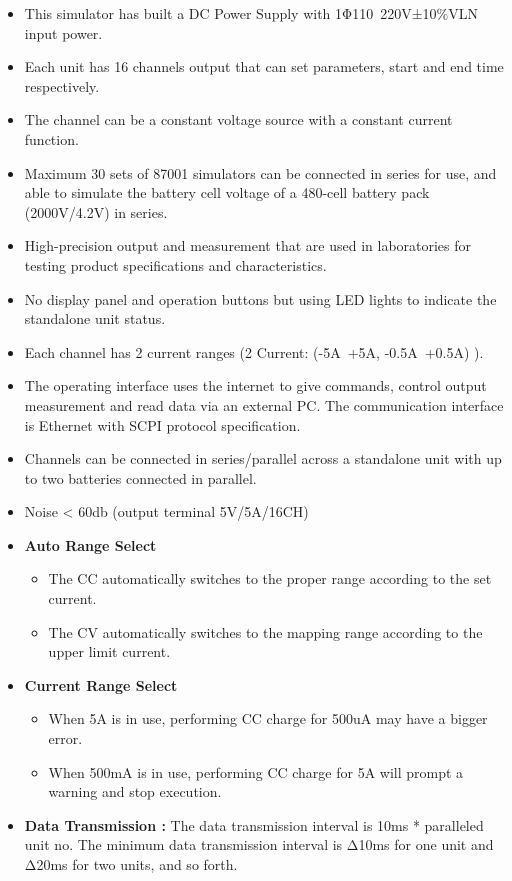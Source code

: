 \begin{itemize}
    \item This simulator has built a DC Power Supply with 1Φ110~220V±10$\%$VLN input power.
    \item Each unit has 16 channels output that can set parameters, start and end time respectively.
    \item The channel can be a constant voltage source with a constant current function.
    \item Maximum 30 sets of 87001 simulators can be connected in series for use, and able to simulate the battery cell voltage of a 480-cell battery pack (2000V/4.2V) in series.
    \item High-precision output and measurement that are used in laboratories for testing product specifications and characteristics.
    \item No display panel and operation buttons but using LED lights to indicate the standalone unit status.
    \item Each channel has 2 current ranges (2 Current: (-5A~+5A, -0.5A~+0.5A) ).
    \item The operating interface uses the internet to give commands, control output measurement and read data via an external PC. The communication interface is Ethernet with SCPI protocol specification.
    \item Channels can be connected in series/parallel across a standalone unit with up to two batteries connected in parallel.
    \item Noise < 60db (output terminal 5V/5A/16CH)
    \item \textbf{Auto Range Select }
            \begin{itemize}
                \item The CC automatically switches to the proper range according to the set current.
                \item The CV automatically switches to the mapping range according to the upper limit current.
            \end{itemize} 
    \item \textbf{Current Range Select }
            \begin{itemize}
                \item When 5A is in use, performing CC charge for 500uA may have a bigger error.
                \item When 500mA is in use, performing CC charge for 5A will prompt a warning and stop execution.
            \end{itemize}

    \item \textbf{Data Transmission :} The data transmission interval is 10ms * paralleled unit no. The minimum data transmission interval is Δ10ms for one unit and Δ20ms for two units, and so forth.
    
\end{itemize}

